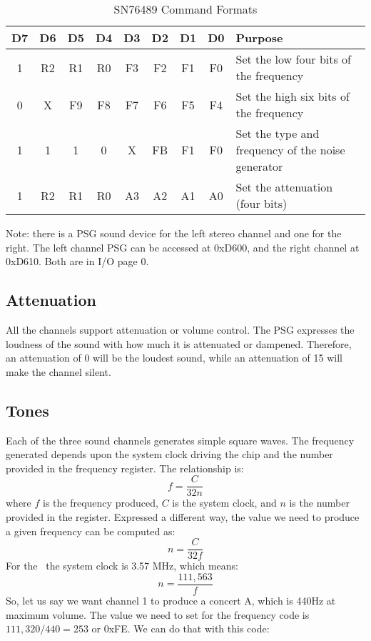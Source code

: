 \begin{table}[ht]
	\begin{center}
		\begin{tabular}{|c|c|c|c|c|c|c|c|l|} \hline
			D7 & D6 & D5 & D4 & D3 & D2 & D1 & D0 & Purpose \\ \hline \hline
			1 & R2 & R1 & R0 & F3 & F2 & F1 & F0 & Set the low four bits of the frequency \\ \hline
			0 & X & F9 & F8 & F7 & F6 & F5 & F4 & Set the high six bits of the frequency \\ \hline
			1 & 1 & 1 & 0 & X & FB & F1 & F0 & Set the type and frequency of the noise generator \\ \hline
			1 & R2 & R1 & R0 & A3 & A2 & A1 & A0 & Set the attenuation (four bits) \\ \hline
		\end{tabular}
		\caption{SN76489 Command Formats}
	\end{center}
	\label{tab:psg_commands}
\end{table}

Note: there is a PSG sound device for the left stereo channel and one for the right. The left channel PSG can be accessed at 0xD600, and the right channel at 0xD610. Both are in I/O page 0.

\subsection*{Attenuation}

All the channels support attenuation or volume control. The PSG expresses the loudness of the sound with how much it is attenuated or dampened. Therefore, an attenuation of 0 will be the loudest sound, while an attenuation of 15 will make the channel silent.

\subsection*{Tones}

Each of the three sound channels generates simple square waves. The frequency generated depends upon the system clock driving the chip and the number provided in the frequency register. The relationship is:
\[
f = \frac{C}{32n}
\]
where $f$ is the frequency produced, $C$ is the system clock, and $n$ is the number provided in the register. Expressed a different way, the value we need to produce a given frequency can be computed as:
\[
n = \frac{C}{32f}
\]
For the \jr\ the system clock is 3.57 MHz, which means:
\[
n = \frac{111,563}{f}
\]
So, let us say we want channel 1 to produce a concert A, which is 440Hz at maximum volume. The value we need to set for the frequency code is $111,320 / 440 = 253$ or 0xFE. We can do that with this code:

